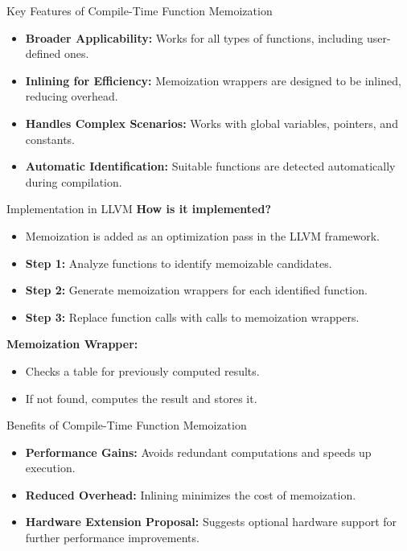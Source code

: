 \documentclass{beamer}
\begin{document}
\begin{frame}{Key Features of Compile-Time Function Memoization}
    \begin{itemize}
        \item \textbf{Broader Applicability:} Works for all types of functions, including user-defined ones.
        \item \textbf{Inlining for Efficiency:} Memoization wrappers are designed to be inlined, reducing overhead.
        \item \textbf{Handles Complex Scenarios:} Works with global variables, pointers, and constants.
        \item \textbf{Automatic Identification:} Suitable functions are detected automatically during compilation.
    \end{itemize}
\end{frame}

\begin{frame}{Implementation in LLVM}
    \textbf{How is it implemented?}
    \begin{itemize}
        \item Memoization is added as an optimization pass in the LLVM framework.
        \item \textbf{Step 1:} Analyze functions to identify memoizable candidates.
        \item \textbf{Step 2:} Generate memoization wrappers for each identified function.
        \item \textbf{Step 3:} Replace function calls with calls to memoization wrappers.
    \end{itemize}
    \vspace{0.3cm}
    \textbf{Memoization Wrapper:}
    \begin{itemize}
        \item Checks a table for previously computed results.
        \item If not found, computes the result and stores it.
    \end{itemize}
\end{frame}

\begin{frame}{Benefits of Compile-Time Function Memoization}
    \begin{itemize}
        \item \textbf{Performance Gains:} Avoids redundant computations and speeds up execution.
        \item \textbf{Reduced Overhead:} Inlining minimizes the cost of memoization.
        \item \textbf{Hardware Extension Proposal:} Suggests optional hardware support for further performance improvements.
    \end{itemize}
\end{frame}
\end{document}
